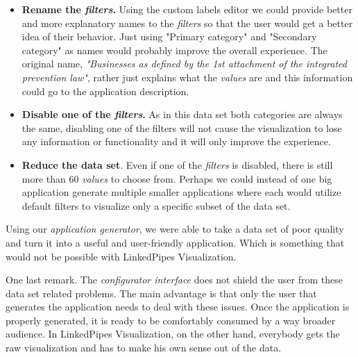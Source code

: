 \begin{itemize}
\item \textbf{Rename the \emph{filters}.} Using the custom labels editor we could provide better and more explanatory names to the \emph{filters} so that the user would get a better idea of their behavior. Just using "Primary category" and "Secondary category" as names would probably improve the overall experience. The original name, \textit{"Businesses as defined by the 1st attachment of the integrated prevention law"}, rather just explains what the \emph{values} are and this information could go to the application description.
\item \textbf{Disable one of the \emph{filters}.} As in this data set both categories are always the same, disabling one of the filters will not cause the visualization to lose any information or functionality and it will only improve the experience.
\item \textbf{Reduce the data set}. Even if one of the \emph{filters} is disabled, there is still more than 60 \emph{values} to choose from. Perhaps we could instead of one big application generate multiple smaller applications where each would utilize default filters to visualize only a specific subset of the data set.
\end{itemize}

Using our \emph{application generator}, we were able to take a data set of poor quality and turn it into a useful and user-friendly application. Which is something that would not be possible with LinkedPipes Visualization.

One last remark. The \emph{configurator interface} does not shield the user from these data set related problems. The main advantage is that only the user that generates the application needs to deal with these issues. Once the application is properly generated, it is ready to be comfortably consumed by a way broader audience. In LinkedPipes Visualization, on the other hand, everybody gets the raw visualization and has to make his own sense out of the data.
